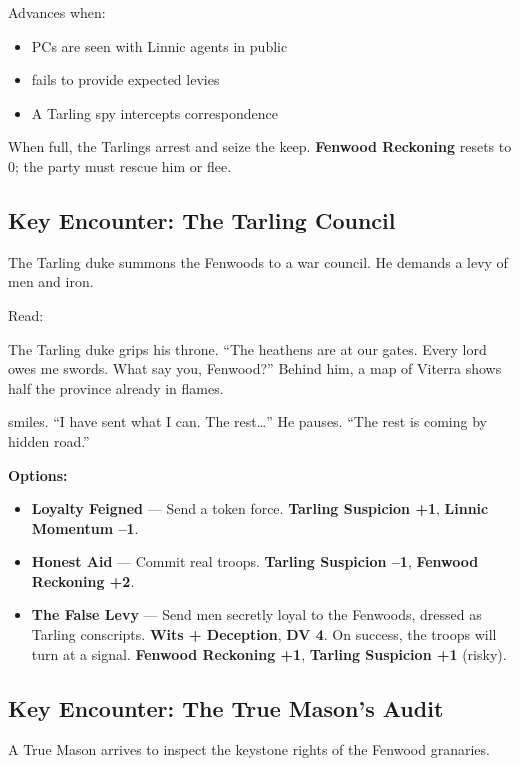 \documentclass[11pt,a5paper]{book}
\newcommand{\dv}[1]{\textbf{DV #1}}
\begin{document}
Advances when:
\begin{itemize}[leftmargin=*]
\item PCs are seen with Linnic agents in public
\item \aldric{} fails to provide expected levies
\item A Tarling spy intercepts correspondence
\end{itemize}
When full, the Tarlings arrest \aldric{} and seize the keep. \textbf{Fenwood Reckoning} resets to 0; the party must rescue him or flee.

\subsection*{Key Encounter: The Tarling Council}

The Tarling duke summons the Fenwoods to a war council. He demands a levy of men and iron.

Read:
\begin{quoting}
The Tarling duke grips his throne. ``The heathens are at our gates. Every lord owes me swords. What say you, Fenwood?'' Behind him, a map of Viterra shows half the province already in flames.

\aldric{} smiles. ``I have sent what I can. The rest\dots'' He pauses. ``The rest is coming by hidden road.''
\end{quoting}

\textbf{Options:}
\begin{itemize}[leftmargin=*]
\item \textbf{Loyalty Feigned} --- Send a token force. \textbf{Tarling Suspicion +1}, \textbf{Linnic Momentum --1}.
\item \textbf{Honest Aid} --- Commit real troops. \textbf{Tarling Suspicion --1}, \textbf{Fenwood Reckoning +2}.
\item \textbf{The False Levy} --- Send men secretly loyal to the Fenwoods, dressed as Tarling conscripts. \textbf{Wits + Deception}, \dv{4}. On success, the troops will turn at a signal. \textbf{Fenwood Reckoning +1}, \textbf{Tarling Suspicion +1} (risky).
\end{itemize}

\subsection*{Key Encounter: The True Mason's Audit}

A True Mason arrives to inspect the keystone rights of the Fenwood granaries.
\end{document}

